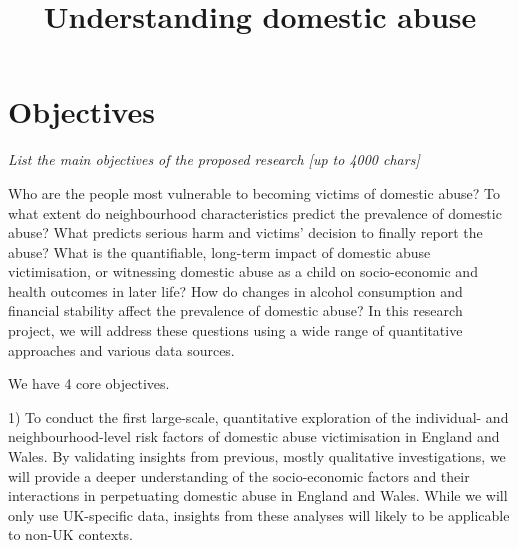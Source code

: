 \documentclass[11pt, a4paper]{article}
\begin{document}
\title{Understanding domestic abuse}
\date{}
\maketitle
\section{Objectives}

%
%
%
%

\textit{List the main objectives of the proposed research [up to 4000 chars]}

Who are the people most vulnerable to becoming victims of domestic abuse? To what extent do neighbourhood characteristics predict the prevalence of domestic abuse? What predicts serious harm and victims' decision to finally report the abuse? What is the quantifiable, long-term impact of domestic abuse victimisation, or witnessing domestic abuse as a child on socio-economic and health outcomes in later life? How do changes in alcohol consumption and financial stability affect the prevalence of domestic abuse? In this research project, we will address these questions using a wide range of quantitative approaches and various data sources.

We have 4 core objectives. 

1) To conduct the first large-scale, quantitative exploration of the individual- and neighbourhood-level risk factors of domestic abuse victimisation in England and Wales. By validating insights from previous, mostly qualitative investigations, we will provide a deeper understanding of the socio-economic factors and their interactions in perpetuating domestic abuse in England and Wales. While we will only use UK-specific data, insights from these analyses will likely to be applicable to non-UK contexts. 
\end{document}
